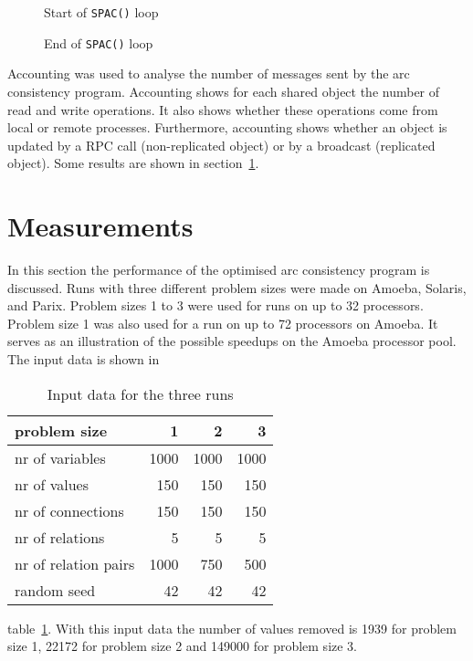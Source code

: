 \documentclass[a4paper,11pt]{article}
\begin{document}
\begin{figure}[htbp]
\begin{center}
\caption{Start of {\tt SPAC()} loop}
\label{fig:new-start}
\end{center}
\end{figure}

\begin{figure}[htbp]
\begin{center}
\caption{End of {\tt SPAC()} loop}
\label{fig:new-end}
\end{center}
\end{figure}

Accounting was used to analyse the number of messages sent by the arc
consistency program. Accounting shows for each shared object the number
of read and write operations. It also shows whether these operations come
from local or remote processes. Furthermore, accounting shows whether an
object is updated by a RPC call (non-replicated object) or by a broadcast
(replicated object). Some results are shown in section~\ref{sec:performance}.

\section{Measurements}
\label{sec:performance}

In this section the performance of the optimised arc consistency program
is discussed. Runs with three different problem sizes
were made on Amoeba, Solaris, and Parix.
Problem sizes 1 to 3
were used for runs on up to 32 processors.
Problem size 1 was also used for a run on up to 72 processors on Amoeba.
It serves as an illustration of the possible speedups
on the Amoeba processor pool. The input data is shown in
\begin{table}[htbp]
\begin{center}
\begin{tabular}{|l|r|r|r|}
\hline
problem size  & 1 & 2 & 3 \\
\hline
nr of variables      & 1000 & 1000 & 1000 \\
nr of values         &  150 &  150 &  150 \\
nr of connections    &  150 &  150 &  150 \\
nr of relations      &    5 &    5 &    5 \\
nr of relation pairs & 1000 &  750 &  500 \\
random seed          &   42 &   42 &   42 \\
\hline
\end{tabular}
\caption{Input data for the three runs}
\label{table:input}
\end{center}
\end{table}
table~\ref{table:input}.
With this input data the number of values removed is 1939 for problem size 1,
22172 for problem size 2 and 149000 for problem size 3.
\end{document}
